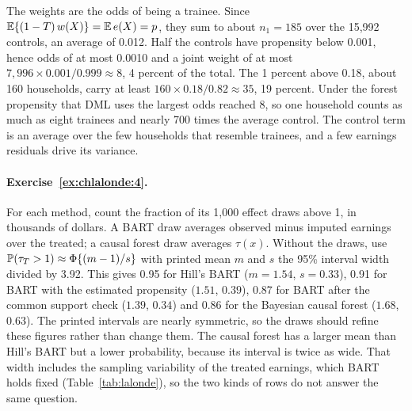 The weights are the odds of being a trainee. Since $\mathbb{E}\{(1 - T)\,w(X)\} = \mathbb{E}\,e(X) = p$, they sum to about $n_1 = 185$ over the 15,992 controls, an average of 0.012. Half the controls have propensity below 0.001, hence odds of at most 0.0010 and a joint weight of at most $7{,}996 \times 0.001/0.999 \approx 8$, 4 percent of the total. The 1 percent above 0.18, about 160 households, carry at least $160 \times 0.18/0.82 \approx 35$, 19 percent. Under the forest propensity that DML uses the largest odds reached 8, so one household counts as much as eight trainees and nearly 700 times the average control. The control term is an average over the few households that resemble trainees, and a few earnings residuals drive its variance.

\paragraph{Exercise~\ref{ex:chlalonde:4}.} For each method, count the fraction of its 1,000 effect draws above 1, in thousands of dollars. A BART draw averages observed minus imputed earnings over the treated; a causal forest draw averages $\tau(x)$. Without the draws, use $\mathbb{P}(\tau_T > 1) \approx \Phi\{(m - 1)/s\}$ with printed mean $m$ and $s$ the 95\% interval width divided by 3.92. This gives 0.95 for Hill's BART ($m = 1.54$, $s = 0.33$), 0.91 for BART with the estimated propensity ($1.51$, $0.39$), 0.87 for BART after the common support check ($1.39$, $0.34$) and 0.86 for the Bayesian causal forest ($1.68$, $0.63$). The printed intervals are nearly symmetric, so the draws should refine these figures rather than change them. The causal forest has a larger mean than Hill's BART but a lower probability, because its interval is twice as wide. That width includes the sampling variability of the treated earnings, which BART holds fixed (Table~\ref{tab:lalonde}), so the two kinds of rows do not answer the same question.


